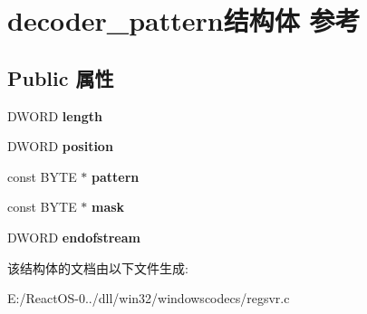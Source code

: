 \hypertarget{structdecoder__pattern}{}\section{decoder\+\_\+pattern结构体 参考}
\label{structdecoder__pattern}
\subsection*{Public 属性}
\begin{DoxyCompactItemize}
\item 
\mbox{\label{structdecoder__pattern_a39f4a66312fd7269fa9d272ed201b6a8}} 
D\+W\+O\+RD {\bfseries length}
\item 
\mbox{\label{structdecoder__pattern_ad3f5baf02b0a9e3cfab6cfac0ba5264e}} 
D\+W\+O\+RD {\bfseries position}
\item 
\mbox{\label{structdecoder__pattern_aab3df3ac1cd6cf14dbcc950ab4d063b6}} 
const B\+Y\+TE $\ast$ {\bfseries pattern}
\item 
\mbox{\label{structdecoder__pattern_a54620a29b1842e3dbd0158be9b217554}} 
const B\+Y\+TE $\ast$ {\bfseries mask}
\item 
\mbox{\label{structdecoder__pattern_ace14a37d0079a8e506d6a71810168602}} 
D\+W\+O\+RD {\bfseries endofstream}
\end{DoxyCompactItemize}


该结构体的文档由以下文件生成\+:\begin{DoxyCompactItemize}
\item 
E\+:/\+React\+O\+S-\/0../dll/win32/windowscodecs/regsvr.\+c\end{DoxyCompactItemize}
